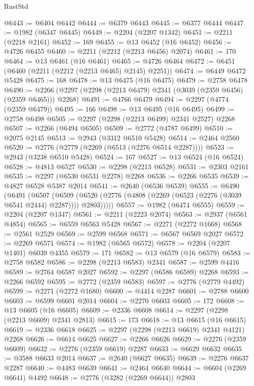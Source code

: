 \begin{lexlean}{RustStd}
\begin{coremodule}
{\begin{coremodule}
{{{{{{{{{{{{{{{{{{{{{{{{{{{{{{{{{{{{{{{{{{{{{{{{{{{{{{@6443 := @6404 @6442
@6444 := @6379 @6443
@6445 := @6377 @6444
@6447 := @1982 (@6347 @6445)
@6449 := @2204 (@2207 @1342)
@6451 := @2211 (@2218 @2161)
@6452 := 169
@6455 := @13 @6452 (@16 @6452)
@6456 := @4726 @6455
@6460 := @2211 (@2212 (@2213 @6456) @2074)
@6461 := 170
@6464 := @13 @6461 (@16 @6461)
@6465 := @4726 @6464
@6472 := @6451 (@6460 (@2211 (@2212 (@2213 @6465) @2145) @2251))
@6474 := @6449 @6472 @5428
@6475 := 168
@6478 := @13 @6475 (@16 @6475)
@6479 := @2758 @6478
@6490 := @2266 (@2297 (@2298 (@2213 @6479) @2341 (@3039 (@2359 @6456) (@2359 @6465))) @2268)
@6491 := @4766 @6479
@6494 := @2297 (@4774 (@2359 @6479))
@6495 := 166
@6498 := @13 @6495 (@16 @6495)
@6499 := @2758 @6498
@6505 := @2297 (@2298 (@2213 @6499) @2341 @2527) @2268
@6507 := @2266 (@6494 @6505)
@6509 := @2772 (@4787 @6499)
@6510 := @2075 @2145
@6513 := @2943 (@3312 @6510 @5428)
@6514 := @2464 @2560
@6520 := @2776 (@2779 (@2269 (@6513 (@2276 @6514 @2287))))
@6523 := @2943 (@3238 @6510 @5428)
@6524 := 167
@6527 := @13 @6524 (@16 @6524)
@6528 := @4813 @6527
@6530 := @2298 (@2213 @6528)
@6531 := @2303 @2161
@6535 := @2297 (@6530 @6531 @2278) @2268
@6536 := @2266 @6535
@6539 := @4827 @6528 @5387 @2014
@6541 := @2640 (@6536 @6539)
@6555 := @6490
    (@6491
      (@6507
        (@6509 (@6520 (@2776 (@4808 (@2269 (@6523 (@2276 (@3039 @6541 @2444) @2287)))) @2803)))))
@6557 := @1982 (@6474 @6555)
@6559 := @2204 (@2207 @1347)
@6561 := @2211 (@2223 @2074)
@6563 := @2937 (@6561 @4854)
@6565 := @6559 @6563 @5428
@6567 := @2271 (@2272 @1668)
@6568 := @2561 @2529
@6569 := @2599 @6568
@6571 := @6567 @6569 @2027
@6572 := @2269 @6571
@6574 := @1982 (@6565 @6572)
@6578 := @2204 (@2207 @1401) @6039 @4355
@6579 := 171
@6582 := @13 @6579 (@16 @6579)
@6583 := @2758 @6582
@6586 := @2298 (@2213 @6583) @2341
@6587 := @2599 @4416
@6589 := @2764 @6587 @2027
@6592 := @2297 (@6586 @6589) @2268
@6593 := @2266 @6592
@6595 := @2772 (@2359 @6583)
@6597 := @2776 (@2779 @4492)
@6599 := @2271 (@2272 @1680)
@6600 := @4414 @2287
@6601 := @2788 @6600
@6603 := @6599 @6601 @2014
@6604 := @2270 @6603
@6605 := 172
@6608 := @13 @6605 (@16 @6605)
@6609 := @2336 @6608
@6614 := @2297 (@2298 (@2213 @6609) @2341 @2813)
@6615 := 173
@6618 := @13 @6615 (@16 @6615)
@6619 := @2336 @6618
@6625 := @2297 (@2298 (@2213 @6619) @2341 @4121) @2268
@6626 := @6614 @6625
@6627 := @2266 @6626
@6629 := @2276 (@2359 @6609)
@6632 := @2276 (@2359 @6619) @2287
@6633 := @6629 @6632
@6635 := @3588 @6633 @2014
@6637 := @2640 (@6627 @6635)
@6639 := @2276 @6637 @2287
@6640 := @4483 @6639
@6641 := @2464 @6640
@6644 := @6604 (@2269 @6641) @4492
@6648 := @2776 (@3282 (@2269 @6644)) @2803
}}}}}}}}}}}}}}}}}}}}}}}}}}}}}}}}}}}}}}}}}}}}}}}}}}}}}}
\end{coremodule}}
\end{coremodule}
\end{lexlean}
